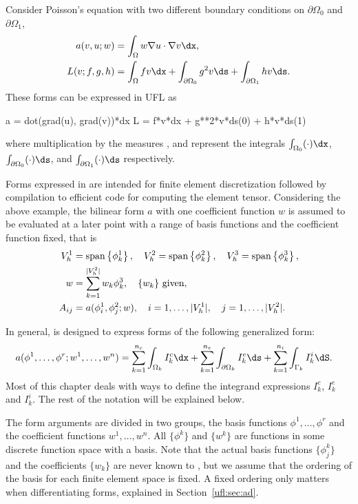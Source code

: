 Consider Poisson's equation with two different boundary
conditions on $\partial\Omega_0$ and $\partial\Omega_1$,
\begin{align}
a(v, u; w) &= \int_\Omega w \nabla u \cdot \nabla v \dx, \\
L(v; f, g, h) &= \int_\Omega f v \dx + \int_{\partial\Omega_0} g^2 v \ds + \int_{\partial\Omega_1} h v \ds.
\end{align}
These forms can be expressed in UFL as
\begin{code}
a = dot(grad(u), grad(v))*dx
L = f*v*dx + g**2*v*ds(0) + h*v*ds(1)
\end{code}
where multiplication by the measures ,  and 
represent the integrals $\int_{\Omega_0} (\cdot) \dx$,
$\int_{\partial\Omega_0} (\cdot) \ds$,
and $\int_{\partial\Omega_1} (\cdot) \ds$
respectively.

Forms expressed in \ufl{} are intended for finite element
discretization followed by compilation to efficient code for computing
the element tensor.  Considering the above example, the bilinear form
$a$ with one coefficient function $w$ is assumed to be evaluated at a
later point with a range of basis functions and the coefficient
function fixed, that is
\begin{align}
V_h^1 &= \operatorname{span}\left\{ \phi_k^1 \right\}, \quad V_h^2 = \operatorname{span}\left\{ \phi_k^2 \right\}, \quad V_h^3 = \operatorname{span}\left\{ \phi_k^3 \right\}, \\
w &= \sum_{k=1}^{|V^2_h|} w_k \phi_k^3, \quad \{ w_k \} \mbox{ given}, \\
A_{ij} &= a(\phi_i^1, \phi_j^2; w),
    \quad i = 1,\ldots,|V^1_h|, \quad j = 1,\ldots,|V^2_h| . \label{ufl:eq:Aij}
\end{align}

In general, \ufl{} is designed to express forms of the following generalized form:
\begin{align} \label{ufl:eq:form_integrals}
    a(&\phi^1, \ldots, \phi^r; w^1, \ldots,  w^n) =
           \sum_{k=1}^{n_c} \int_{\Omega_k}          I^c_k \dx
         + \sum_{k=1}^{n_e} \int_{\partial\Omega_k}  I^e_k \ds
         + \sum_{k=1}^{n_i} \int_{\Gamma_k}          I^i_k \dS.
\end{align}
Most of this chapter deals with ways to define the integrand
expressions $I^c_k$, $I^e_k$ and $I^i_k$.  The rest of the notation
will be explained below.

The form arguments are divided in two groups, the basis functions
$\phi^1,\ldots,\phi^r$ and the coefficient functions $w^1,\ldots,w^n$.
All $\{ \phi^k \}$ and $\{ w^k \}$ are functions in some discrete
function space with a basis.  Note that the actual basis functions $\{
\phi_j^k \}$ and the coefficients $\{ w_k \}$ are never known to
\ufl{}, but we assume that the ordering of the basis for each finite
element space is fixed. A fixed ordering only matters when
differentiating forms, explained in Section~\ref{ufl:sec:ad}.

